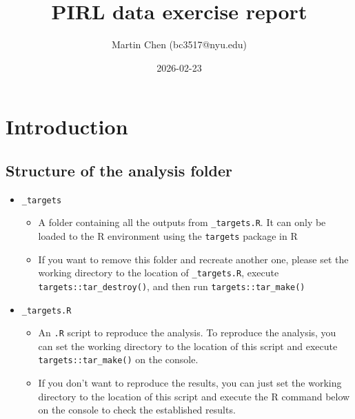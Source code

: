 \documentclass[
  letterpaper,
  DIV=11,
  numbers=noendperiod]{scrartcl}
\title{PIRL data exercise report}
\author{Martin Chen (bc3517@nyu.edu)}
\date{2026-02-23}
\providecommand{\tightlist}{%
  \setlength{\itemsep}{0pt}\setlength{\parskip}{0pt}}
\renewcommand*\contentsname{Table of contents}
\newcommand\contentsname{Table of contents}
\begin{document}
\maketitle

\renewcommand*\contentsname{Table of contents}
{
\hypersetup{linkcolor=}
\setcounter{tocdepth}{3}
\tableofcontents
}

\newpage{}

\section{Introduction}\label{introduction}

\subsection{Structure of the analysis
folder}\label{structure-of-the-analysis-folder}

\begin{itemize}
\item
  \texttt{\_targets}

  \begin{itemize}
  \tightlist
  \item
    A folder containing all the outputs from \texttt{\_targets.R}. It
    can only be loaded to the R environment using the \texttt{targets}
    package in R
  \item
    If you want to remove this folder and recreate another one, please
    set the working directory to the location of \texttt{\_targets.R},
    execute \texttt{targets::tar\_destroy()}, and then run
    \texttt{targets::tar\_make()}
  \end{itemize}
\item
  \texttt{\_targets.R}

  \begin{itemize}
  \item
    An \texttt{.R} script to reproduce the analysis. To reproduce the
    analysis, you can set the working directory to the location of this
    script and execute \texttt{targets::tar\_make()} on the console.
  \item
    If you don't want to reproduce the results, you can just set the
    working directory to the location of this script and execute the R
    command below on the console to check the established results.
  \end{itemize}
\end{itemize}
\end{document}
